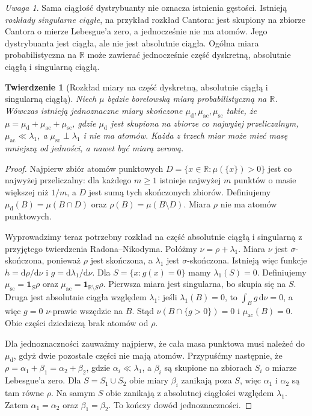 \documentclass[11pt,a4paper,oneside]{report}
\numberwithin{equation}{chapter}
\theoremstyle{plain}
\newtheorem{twierdzenie}{Twierdzenie}[chapter]
\theoremstyle{definition}
\theoremstyle{remark}
\newtheorem{uwaga}{Uwaga}[chapter]
\newcommand{\R}{\mathbb{R}}
\newcommand{\ind}[1]{\mathbf{1}_{#1}}
\newcommand{\dd}{\mathrm{d}}
\begin{document}
\begin{uwaga}
Sama ciągłość dystrybuanty nie oznacza istnienia gęstości.
Istnieją \emph{rozkłady singularne ciągłe}, na przykład rozkład
Cantora: jest skupiony na zbiorze Cantora o mierze Lebesgue'a zero,
a jednocześnie nie ma atomów. Jego dystrybuanta jest ciągła,
ale nie jest absolutnie ciągła. Ogólna miara probabilistyczna na $\R$
może zawierać jednocześnie część dyskretną, absolutnie ciągłą
i singularną ciągłą.
\end{uwaga}


\begin{twierdzenie}[Rozkład miary na część dyskretną, absolutnie ciągłą i singularną ciągłą]
Niech $\mu$ będzie borelowską miarą probabilistyczną na $\R$.
Wówczas istnieją jednoznaczne miary skończone
$\mu_{\mathrm d},\mu_{\mathrm{ac}},\mu_{\mathrm{sc}}$
takie, że $\mu=\mu_{\mathrm d}+\mu_{\mathrm{ac}}+
\mu_{\mathrm{sc}}$, gdzie $\mu_{\mathrm d}$ jest skupiona
na zbiorze co najwyżej przeliczalnym,
$\mu_{\mathrm{ac}}\ll\lambda_1$,
a $\mu_{\mathrm{sc}}\perp\lambda_1$ i nie ma atomów.
Każda z trzech miar może mieć masę mniejszą od jedności,
a nawet być miarą zerową.
\end{twierdzenie}
\begin{proof}
Najpierw zbiór atomów punktowych
$D=\{x\in\R:\mu(\{x\})>0\}$ jest co najwyżej
przeliczalny: dla każdego $m\geq1$ istnieje najwyżej
$m$ punktów o masie większej niż $1/m$, a
$D$ jest sumą tych skończonych zbiorów.
Definiujemy $\mu_{\mathrm d}(B)=\mu(B\cap D)$
oraz $\rho(B)=\mu(B\setminus D)$. Miara $\rho$
nie ma atomów punktowych.

Wyprowadzimy teraz potrzebny rozkład na część absolutnie
ciągłą i singularną z przyjętego twierdzenia
Radona--Nikodyma. Połóżmy $\nu=\rho+\lambda_1$.
Miara $\nu$ jest $\sigma$-skończona, ponieważ
$\rho$ jest skończona, a $\lambda_1$ jest
$\sigma$-skończona. Istnieją więc funkcje
$h=\dd\rho/\dd\nu$ i $g=\dd\lambda_1/\dd\nu$.
Dla $S=\{x:g(x)=0\}$ mamy $\lambda_1(S)=0$.
Definiujemy $\mu_{\mathrm{sc}}=\ind{S}\rho$ oraz
$\mu_{\mathrm{ac}}=\ind{\R\setminus S}\rho$.
Pierwsza miara jest singularna, bo skupia się na $S$.
Druga jest absolutnie ciągła względem $\lambda_1$:
jeśli $\lambda_1(B)=0$, to
$\int_B g\,\dd\nu=0$, a więc $g=0$
$\nu$-prawie wszędzie na $B$. Stąd
$\nu(B\cap\{g>0\})=0$ i
$\mu_{\mathrm{ac}}(B)=0$.
Obie części dziedziczą brak atomów od $\rho$.

Dla jednoznaczności zauważmy najpierw, że cała
masa punktowa musi należeć do $\mu_{\mathrm d}$,
gdyż dwie pozostałe części nie mają atomów.
Przypuśćmy następnie, że
$\rho=\alpha_1+\beta_1=\alpha_2+\beta_2$,
gdzie $\alpha_i\ll\lambda_1$, a $\beta_i$
są skupione na zbiorach $S_i$ o miarze Lebesgue'a zero.
Dla $S=S_1\cup S_2$ obie miary $\beta_i$
zanikają poza $S$, więc $\alpha_1$ i $\alpha_2$
są tam równe $\rho$. Na samym $S$ obie zanikają
z absolutnej ciągłości względem $\lambda_1$.
Zatem $\alpha_1=\alpha_2$ oraz
$\beta_1=\beta_2$. To kończy dowód jednoznaczności.
\end{proof}
\end{document}
